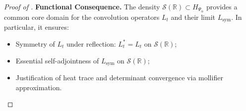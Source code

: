 \begin{proof}[Proof of ]
\medskip
\noindent\textbf{Functional Consequence.}
The density \( \mathcal{S}(\mathbb{R}) \subset H_{\Psi_\alpha} \) provides a common core domain for the convolution operators \( L_t \) and their limit \( L_{\mathrm{sym}} \). In particular, it ensures:
\begin{itemize}
    \item Symmetry of \( L_t \) under reflection: \( L_t^* = L_t \) on \( \mathcal{S}(\mathbb{R}) \);
    \item Essential self-adjointness of \( L_{\mathrm{sym}} \) on \( \mathcal{S}(\mathbb{R}) \);
    \item Justification of heat trace and determinant convergence via mollifier approximation.
\end{itemize}
\end{proof}
